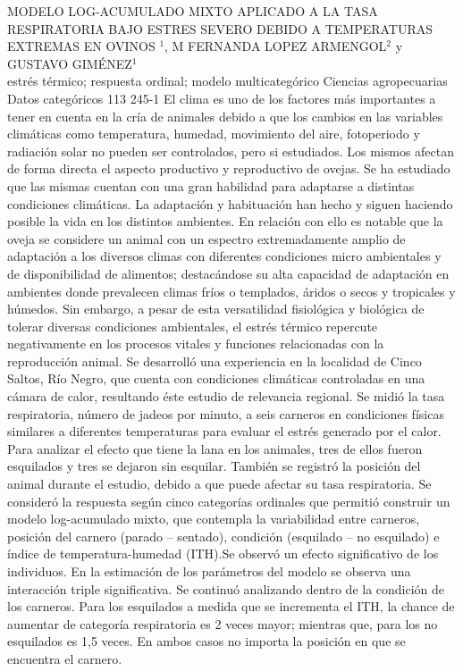 \A
{MODELO LOG-ACUMULADO MIXTO APLICADO A LA TASA RESPIRATORIA BAJO ESTRES SEVERO DEBIDO A TEMPERATURAS EXTREMAS EN OVINOS}
{$^1$, M FERNANDA LOPEZ ARMENGOL$^2$ y GUSTAVO GIMÉNEZ$^1$}
{
\\}
{estrés térmico; respuesta ordinal; modelo multicategórico} 
 {Ciencias agropecuarias} 
 {Datos categóricos} 
 {113} 
 {245-1}
{El clima es uno de los factores más importantes a tener en cuenta en la cría de animales debido a que los cambios en las variables climáticas como temperatura, humedad, movimiento del aire, fotoperiodo y radiación solar no pueden ser controlados, pero si estudiados. Los mismos afectan de forma directa el aspecto productivo y reproductivo de ovejas. Se ha estudiado que las mismas cuentan con una gran habilidad para adaptarse a distintas condiciones climáticas. La adaptación y habituación han hecho y siguen haciendo posible la vida en los distintos ambientes. En relación con ello es notable que la oveja se considere un animal con un espectro extremadamente amplio de adaptación a los diversos climas con diferentes condiciones micro ambientales y de disponibilidad de alimentos; destacándose su alta capacidad de adaptación en ambientes donde prevalecen climas fríos o templados, áridos o secos y tropicales y húmedos. Sin embargo, a pesar de esta versatilidad fisiológica y biológica de tolerar diversas condiciones ambientales, el estrés térmico repercute negativamente en los procesos vitales y funciones relacionadas con la reproducción animal. Se desarrolló una experiencia en la localidad de Cinco Saltos, Río Negro, que cuenta con condiciones climáticas controladas en una cámara de calor, resultando éste estudio de relevancia regional. Se midió la tasa respiratoria, número de jadeos por minuto, a seis carneros en condiciones físicas similares a diferentes temperaturas para evaluar el estrés generado por el calor. Para analizar el efecto que tiene la lana en los animales, tres de ellos fueron esquilados y tres se dejaron sin esquilar. También se registró la posición del animal durante el estudio, debido a que puede afectar su tasa respiratoria. Se consideró la respuesta según cinco categorías ordinales que permitió construir un modelo log-acumulado mixto, que contempla la variabilidad entre carneros, posición del carnero (parado – sentado), condición (esquilado – no esquilado) e índice de temperatura-humedad (ITH).Se observó un efecto significativo de los individuos. En la estimación de los parámetros del modelo se observa una interacción triple significativa. Se continuó analizando dentro de la condición de los carneros. Para los esquilados a medida que se incrementa el ITH, la chance de aumentar de categoría respiratoria es 2 veces mayor; mientras que, para los no esquilados es 1,5 veces. En ambos casos no importa la posición en que se encuentra el carnero.}
